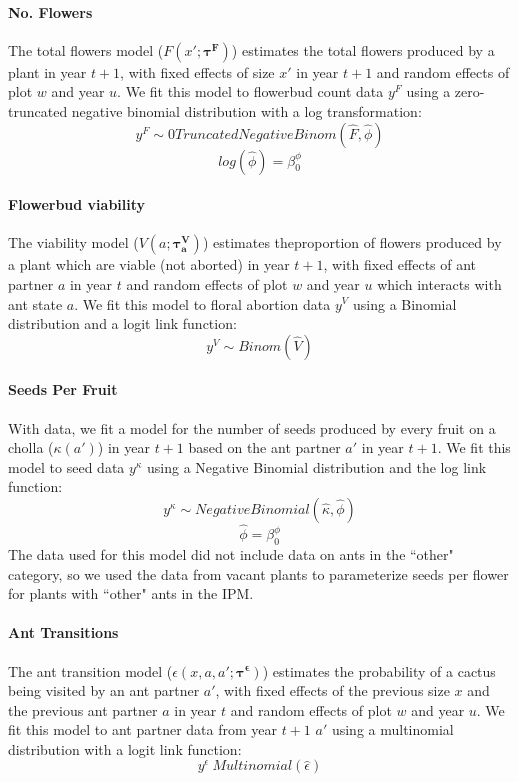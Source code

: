\documentclass[11pt]{article}
\begin{document}
\paragraph{No. Flowers}
The total flowers model ($F(x';\pmb{\tau^{F}})$) estimates the total flowers produced by a plant in year $t+1$, with fixed effects of size $x'$ in year $t+1$ and random effects of plot $w$ and year $u$. 
We fit this model to flowerbud count data $y^F$ using a zero-truncated negative binomial distribution with a log transformation:
$$y^{F} \sim 0 Truncated Negative Binom(\hat{F},\hat{\phi})$$
$$log(\hat{\phi}) = \beta_{0}^{\phi}$$


\paragraph{Flowerbud viability}
The viability model ($V(a;\pmb{\tau^{V}_{a}})$) estimates theproportion of flowers produced by a plant which are viable (not aborted) in year $t+1$, with fixed effects of ant partner $a$ in year $t$ and random effects of plot $w$ and year $u$ which interacts with ant state $a$.
We fit this model to floral abortion data $y^V$ using a Binomial distribution and a logit link function:
$$y^{V} \sim Binom(\hat{V})$$


\paragraph{Seeds Per Fruit}
With data\cite{Miller2006}, we fit a model for the number of seeds produced by every fruit on a cholla ($\kappa(a')$) in year $t+1$ based on the ant partner $a'$ in year $t+1$.
We fit this model to seed data $y^{\kappa}$ using a Negative Binomial distribution and the log link function: 
$$y^{\kappa} \sim  Negative Binomial(\hat{\kappa},\hat{\phi})$$
$$\hat{\phi} = \beta_{0}^{\phi}$$
The data used for this model did not include data on ants in the ``other" category, so we used the data from vacant plants to parameterize seeds per flower for plants with ``other" ants in the IPM.

\paragraph{Ant Transitions}
The ant transition model ($\epsilon(x,a,a';\pmb{\tau^{\epsilon}})$) estimates the probability of a cactus being visited by an ant partner $a'$, with fixed effects of the previous size $x$  and the previous ant partner $a$  in year $t$ and random effects of plot $w$ and year $u$.
We fit this model to ant partner data from year $t+1$ $a'$ using a multinomial distribution with a logit link function: 
$$y^{\epsilon} ~ Multinomial(\hat{\epsilon})$$
\end{document}
